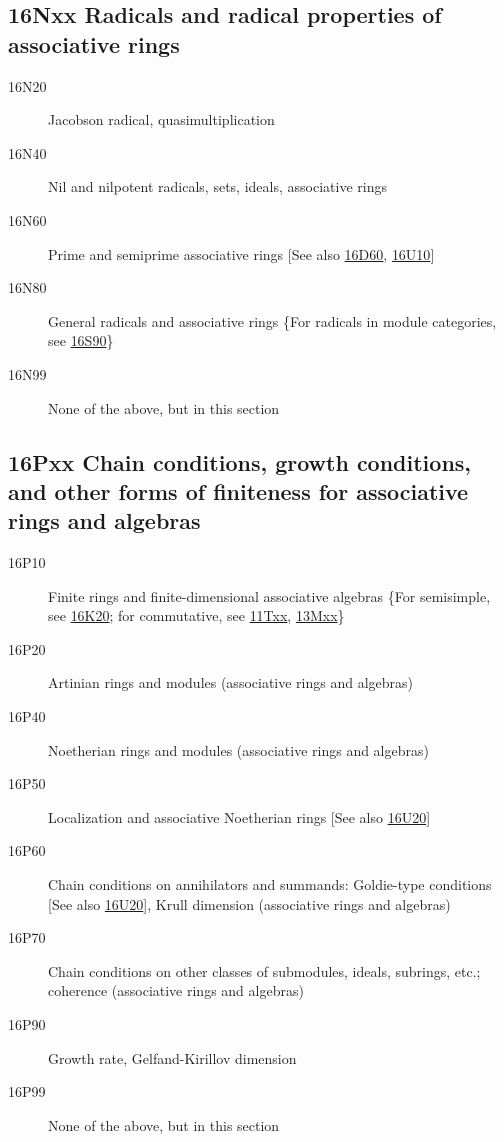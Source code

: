 \subsection*{16Nxx  Radicals and radical properties of associative rings }\label{16Nxx}
\begin{description}  
\item [16N20]\label{16N20} Jacobson radical, quasimultiplication
\item [16N40]\label{16N40} Nil and nilpotent radicals, sets, ideals, associative rings
\item [16N60]\label{16N60} Prime and semiprime associative rings [See also \hyperref[16D60]{16D60}, \hyperref[16U10]{16U10}]
\item [16N80]\label{16N80} General radicals and associative rings \{For radicals in module categories, see \hyperref[16S90]{16S90}\}
\item [16N99]\label{16N99} None of the above, but in this section
\end{description}
\subsection*{16Pxx  Chain conditions, growth conditions, and other forms of finiteness for associative rings and algebras}\label{16Pxx}
\begin{description}  
\item [16P10]\label{16P10} Finite rings and finite-dimensional associative algebras \{For semisimple, see \hyperref[16K20]{16K20}; for commutative, see \hyperref[11Txx]{11Txx}, \hyperref[13Mxx]{13Mxx}\}
\item [16P20]\label{16P20} Artinian rings and modules (associative rings and algebras)
\item [16P40]\label{16P40} Noetherian rings and modules (associative rings and algebras)
\item [16P50]\label{16P50} Localization and associative Noetherian rings [See also \hyperref[16U20]{16U20}]
\item [16P60]\label{16P60} Chain conditions on annihilators and summands: Goldie-type conditions [See also \hyperref[16U20]{16U20}], Krull dimension (associative rings and algebras)
\item [16P70]\label{16P70} Chain conditions on other classes of submodules, ideals, subrings, etc.; coherence (associative rings and algebras)
\item [16P90]\label{16P90} Growth rate, Gelfand-Kirillov dimension
\item [16P99]\label{16P99} None of the above, but in this section
\end{description}
